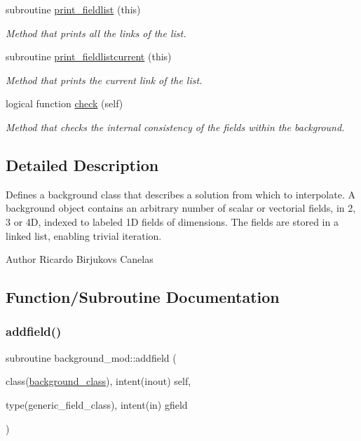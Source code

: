\begin{DoxyCompactItemize}
subroutine \mbox{\hyperlink{namespacebackground__mod_acdcc52b4fb298bc145a121f9e8a4b929}{print\+\_\+fieldlist}} (this)
\begin{DoxyCompactList}\small\item\em Method that prints all the links of the list. \end{DoxyCompactList}\item 
subroutine \mbox{\hyperlink{namespacebackground__mod_a2bd18f3830c0667741efd086d36753db}{print\+\_\+fieldlistcurrent}} (this)
\begin{DoxyCompactList}\small\item\em Method that prints the current link of the list. \end{DoxyCompactList}\item 
logical function \mbox{\hyperlink{namespacebackground__mod_af2f517e4aa946491744e012153045bd4}{check}} (self)
\begin{DoxyCompactList}\small\item\em Method that checks the internal consistency of the fields within the background. \end{DoxyCompactList}\end{DoxyCompactItemize}


\subsection{Detailed Description}
Defines a background class that describes a solution from which to interpolate. A background object contains an arbitrary number of scalar or vectorial fields, in 2, 3 or 4D, indexed to labeled 1D fields of dimensions. The fields are stored in a linked list, enabling trivial iteration. 

\begin{DoxyAuthor}{Author}
Ricardo Birjukovs Canelas 
\end{DoxyAuthor}


\subsection{Function/\+Subroutine Documentation}
\mbox{\label{namespacebackground__mod_aa6ddc308698724f00ce1177ded5afc4c}} 
\subsubsection{\texorpdfstring{addfield()}{addfield()}}
{\footnotesize\ttfamily subroutine background\+\_\+mod\+::addfield (\begin{DoxyParamCaption}\item[{class(\mbox{\hyperlink{structbackground__mod_1_1background__class}{background\+\_\+class}}), intent(inout)}]{self,  }\item[{type(generic\+\_\+field\+\_\+class), intent(in)}]{gfield }\end{DoxyParamCaption})\hspace{0.3cm}{\ttfamily [private]}}



